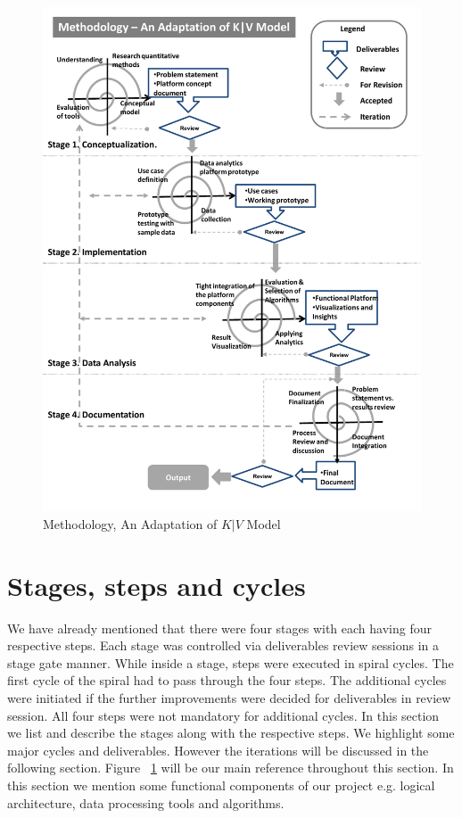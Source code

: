  \begin{figure}[!h]
   \begin{center}
     \includegraphics[width=\textwidth]{images/kv_method.pdf}
     \caption{Methodology, An Adaptation of \(K|V\) Model}
     \label{fig:kv}
   \end{center}
 \end{figure} 
\section{Stages, steps and cycles}\label{stages} 
We have already mentioned that there were four stages with each having four respective steps. Each stage was controlled via deliverables review sessions in a stage gate manner. While inside a stage, steps were executed in spiral cycles. The first cycle of the spiral had to pass through the four steps. The additional cycles were initiated if the further improvements were decided for deliverables in review session. All four steps were not mandatory for additional cycles. In this section we list and describe the stages along with the respective steps. We highlight some major cycles and deliverables. However the iterations will be discussed in the following section. Figure ~\ref{fig:kv} will be our main reference throughout this section. In this section we mention some functional components of our project e.g. logical architecture, data processing tools and algorithms. 

